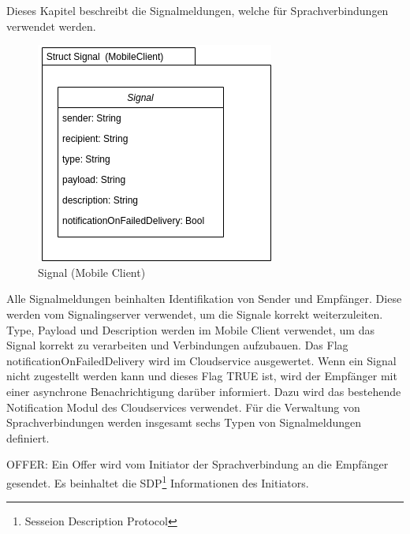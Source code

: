 Dieses Kapitel beschreibt die Signalmeldungen, welche für Sprachverbindungen verwendet werden.

\begin{figure}[h]
    \centering
    \begin{minipage}[b]{0.4\textwidth}
        \includegraphics[width=\textwidth]{graphics/diagramms/Class_Signal_V01}
        \caption{Signal (Mobile Client)}
    \end{minipage}
\end{figure}

Alle Signalmeldungen beinhalten Identifikation von Sender und Empfänger.
Diese werden vom Signalingserver verwendet, um die Signale korrekt weiterzuleiten.
Type, Payload und Description werden im Mobile Client verwendet, um das Signal korrekt zu verarbeiten und Verbindungen aufzubauen.
Das Flag notificationOnFailedDelivery wird im Cloudservice ausgewertet.
Wenn ein Signal nicht zugestellt werden kann und dieses Flag TRUE ist, wird der Empfänger mit einer asynchrone Benachrichtigung darüber informiert.
Dazu wird das bestehende Notification Modul des Cloudservices verwendet.
Für die Verwaltung von Sprachverbindungen werden insgesamt sechs Typen von Signalmeldungen definiert.

OFFER: Ein Offer wird vom Initiator der Sprachverbindung an die Empfänger gesendet.
Es beinhaltet die SDP\footnote{Sesseion Description Protocol} Informationen des Initiators.  \\

